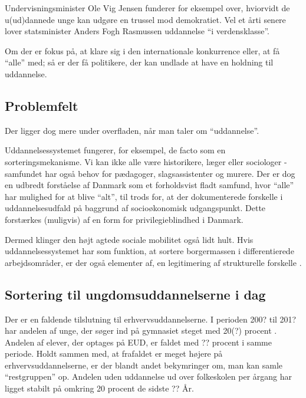 Undervisningsminister Ole Vig Jensen funderer for eksempel over, hviorvidt de u(ud)dannede unge kan udgøre en trussel mod demokratiet.
 Vel et årti senere lover statsminister Anders Fogh Rasmussen uddannelse “i verdensklasse”.

 Om der er fokus på, at klare sig i den internationale konkurrence eller, at få “alle” med; så er der få politikere, der kan undlade at have en holdning til uddannelse.

\subsection{Problemfelt}
\label{sec:problem}
Der ligger dog mere under overfladen, når man taler om “uddannelse”.

Uddannelsessystemet fungerer, for eksempel, de facto som en sorteringsmekanisme.
Vi kan ikke alle være historikere, læger eller sociologer - samfundet har også behov for pædagoger, slagsassistenter og murere.
Der er dog en udbredt forståelse af Danmark som et forholdsvist fladt samfund, hvor “alle” har mulighed for at blive “alt”, til trods for, at der dokumenterede forskelle i uddannelsesudfald på baggrund af socioøkonomisk udgangspunkt.
Dette forstærkes (muligvis) af en form for privilegieblindhed i Danmark.  

Dermed klinger den højt agtede sociale mobilitet også lidt hult.
Hvis uddannelsessystemet har som funktion, at sortere borgermassen i differentierede arbejdsområder, er der også elementer af, en legitimering af strukturelle forskelle .


\subsection{Sortering til ungdomsuddannelserne i dag}
\label{sec:sorting}
Der er en faldende tilslutning til erhvervsuddannelserne.
I perioden 200? til 201? har andelen af unge, der søger ind på gymnasiet steget med 20(?) procent .
Andelen af elever, der optages på EUD, er faldet med ?? procent i samme periode.
Holdt sammen med, at frafaldet er meget højere på erhvervsuddannelserne, er der blandt andet bekymringer om, man kan samle “restgruppen” op. Andelen uden uddannelse ud over folkeskolen per årgang har ligget stabilt på omkring 20 procent de sidste ?? År.

